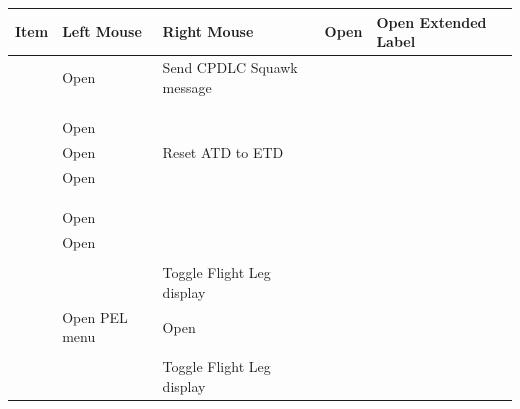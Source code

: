 \documentclass[a4paper,oneside,11pt]{memoir}
\begin{document}
\begin{longtable}{|p{}|p{}|p{}|}          \hline
  \textbf{Item}         & \textbf{Left Mouse}           & \textbf{Right Mouse}      \endhead \hline
   & Open          & Open Extended Label       \\ \hline
       & Open        & Send CPDLC Squawk message \\ \hline
       &                               &                           \\ \hline
       &                               &                           \\ \hline
       &                               &                           \\ \hline
        & Open          &                           \\ \hline
        & Open          & Reset ATD to ETD          \\ \hline
       & Open          &                           \\ \hline
         &                               &                           \\ \hline
      &                               &                           \\ \hline
   &                               &                           \\ \hline
       & Open          &                           \\ \hline
        & Open          &                           \\ \hline
        &                               &                           \\ \hline
      &                               & Toggle Flight Leg display \\ \hline
        & Open PEL menu                 & Open      \\ \hline
       &                               &                           \\ \hline
      &                               & Toggle Flight Leg display \\ \hline

\end{longtable}
\end{document}
